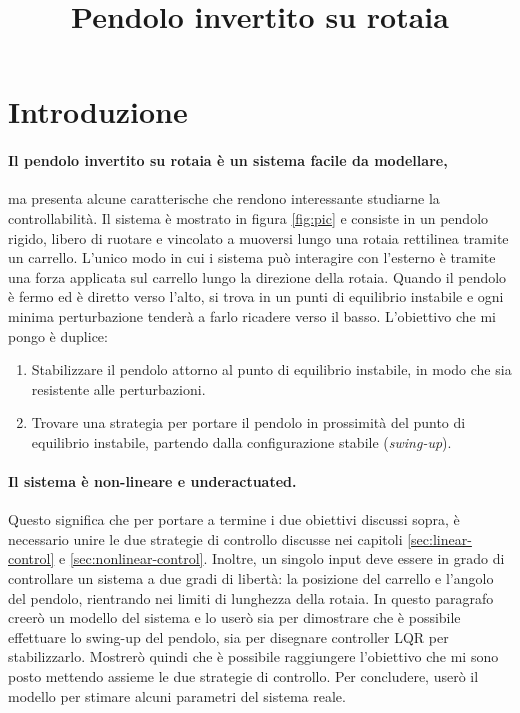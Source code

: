 \title{Pendolo invertito su rotaia}
\maketitle
\label{sec:pic}


\section{Introduzione}
\paragraph{Il pendolo invertito su rotaia è un sistema facile da modellare,}
ma presenta alcune caratterische che rendono interessante studiarne la controllabilità.
Il sistema è mostrato in figura \ref{fig:pic} e consiste in un pendolo rigido, libero di ruotare e vincolato a muoversi lungo una rotaia rettilinea tramite un carrello. L'unico modo in cui i sistema può interagire con l'esterno è tramite una forza applicata sul carrello lungo la direzione della rotaia. Quando il pendolo è fermo ed è diretto verso l'alto, si trova in un punti di equilibrio instabile e ogni minima perturbazione tenderà a farlo ricadere verso il basso. L'obiettivo che mi pongo è duplice:

\begin{enumerate}
    \item Stabilizzare il pendolo attorno al punto di equilibrio instabile, in modo che sia resistente alle perturbazioni.
    \item Trovare una strategia per portare il pendolo in prossimità del punto di equilibrio instabile, partendo dalla configurazione stabile (\emph{swing-up}).
\end{enumerate}

\paragraph{Il sistema è non-lineare e underactuated.} Questo significa che per portare a termine i due obiettivi discussi sopra, è necessario unire le due strategie di controllo discusse nei capitoli \ref{sec:linear-control}  e \ref{sec:nonlinear-control}. Inoltre, un singolo input deve essere in grado di controllare un sistema a due gradi di libertà: la posizione del carrello e l'angolo del pendolo, rientrando nei limiti di lunghezza della rotaia. In questo paragrafo creerò un modello del sistema e lo userò sia per dimostrare che è possibile effettuare lo swing-up del pendolo, sia per disegnare controller LQR per stabilizzarlo. Mostrerò quindi che è possibile raggiungere l'obiettivo che mi sono posto mettendo assieme le due strategie di controllo. Per concludere, userò il modello per stimare alcuni parametri del sistema reale.

